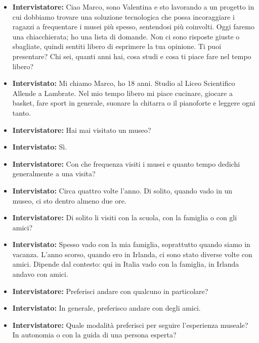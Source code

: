\documentclass{article}
\begin{document}
\begin{itemize}

    \item \textbf{Intervistatore:} Ciao Marco, sono Valentina e sto lavorando a un progetto in cui dobbiamo trovare una soluzione tecnologica che possa incoraggiare i ragazzi a frequentare i musei più spesso, sentendosi più coinvolti. Oggi faremo una chiacchierata; ho una lista di domande. Non ci sono risposte giuste o sbagliate, quindi sentiti libero di esprimere la tua opinione. Ti puoi presentare? Chi sei, quanti anni hai, cosa studi e cosa ti piace fare nel tempo libero?

    \item \textbf{Intervistato:} Mi chiamo Marco, ho 18 anni. Studio al Liceo Scientifico Allende a Lambrate. Nel mio tempo libero mi piace cucinare, giocare a basket, fare sport in generale, suonare la chitarra o il pianoforte e leggere ogni tanto.

    \item \textbf{Intervistatore:} Hai mai visitato un museo?

    \item \textbf{Intervistato:} Sì.

    \item \textbf{Intervistatore:} Con che frequenza visiti i musei e quanto tempo dedichi generalmente a una visita?

    \item \textbf{Intervistato:} Circa quattro volte l’anno. Di solito, quando vado in un museo, ci sto dentro almeno due ore.

    \item \textbf{Intervistatore:} Di solito li visiti con la scuola, con la famiglia o con gli amici?

    \item \textbf{Intervistato:} Spesso vado con la mia famiglia, soprattutto quando siamo in vacanza. L’anno scorso, quando ero in Irlanda, ci sono stato diverse volte con amici. Dipende dal contesto: qui in Italia vado con la famiglia, in Irlanda andavo con amici.

    \item \textbf{Intervistatore:} Preferisci andare con qualcuno in particolare?

    \item \textbf{Intervistato:} In generale, preferisco andare con degli amici.

    \item \textbf{Intervistatore:} Quale modalità preferisci per seguire l’esperienza museale? In autonomia o con la guida di una persona esperta?


\end{itemize}
\end{document}
